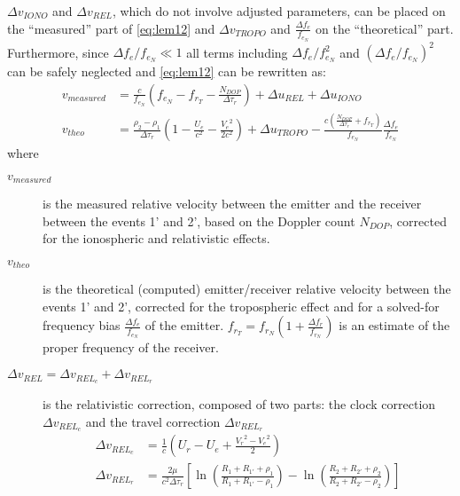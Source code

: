 $\Delta v_{IONO}$ and $\Delta v_{REL}$, which do not involve adjusted parameters, can be placed 
on the ``measured'' part of \autoref{eq:lem12} and $\Delta v_{TROPO}$ and $\frac{\Delta f_e}{f_{e_N}}$ 
on the ``theoretical'' part. Furthermore, since $\Delta f_e / f_{e_N} \ll 1$ all  
terms including $\Delta f_e / f^2_{e_N}$ and $\left(\Delta f_e / f_{e_N}\right)^2$ 
can be safely neglected and \autoref{eq:lem12} can be rewritten as:
\begin{subequations}\label{eq:lem13}
    \begin{align}
        v_{measured} & = \frac{c}{f_{e_N}} (f_{e_N} - f_{r_T} -
          \frac{N_{DOP}}{\Delta\tau_r}) + \Delta u_{REL} + 
          \Delta u_{IONO} \label{eq:lem13a} \\
        v_{theo} &= \frac{\rho_2 - \rho_1}{\Delta\tau_r} 
          (1- \frac{U_e}{c^2} - \frac{{V_e}^2}{2 c^2}) + 
          \Delta u_{TROPO} - \frac{c(\frac{N_{DOP}}{\Delta\tau_r} + 
          f_{r_T})}{f_{e_N}} \frac{\Delta f_e}{f_{e_N}} \label{eq:lem13b}
    \end{align}
\end{subequations}
where 
\begin{description}
    \item[$v_{measured}$] is the measured relative velocity between the emitter and 
    the receiver between the events 1' and 2', based on the Doppler count $N_{DOP}$, 
    corrected for the ionospheric and relativistic effects.

    \item[$v_{theo}$] is the theoretical (computed) emitter/receiver relative velocity 
    between the events 1' and 2', corrected for the tropospheric effect and for a solved-for 
    frequency bias $\frac{\Delta f_e}{f_{e_N}}$ of the emitter. 
    $f_{r_T} = f_{r_N} (1 + \frac{\Delta f_r}{f_{r_N}})$ 
    is an estimate of the proper frequency of the receiver.

    \item[$\Delta v_{REL} = \Delta v_{{REL}_c} + \Delta v_{{REL}_r}$] is the relativistic 
    correction, composed of two parts: the clock correction $\Delta v_{{REL}_c}$ and the 
    travel correction $\Delta v_{{REL}_r}$
    \begin{subequations}\label{eq:lem14}
        \begin{align}
            \Delta v_{{REL}_c} & = \frac{1}{c} 
              (U_r - U_e + \frac{{V_r}^2 - {V_e}^2}{2}) \label{eq:lem14a}\\
            \Delta v_{{REL}_r} & = \frac{2 \mu}{c^2 \Delta\tau_r} \left[ 
              \ln{(\frac{R_1 + R_{1'} + \rho_1}{R_1 + R_{1'} - \rho_1})} - 
              \ln{(\frac{R_2 + R_{2'} + \rho_2}{R_2 + R_{2'} - \rho_2})} \right] \label{eq:lem14b}
        \end{align}
    \end{subequations}
\end{description}


